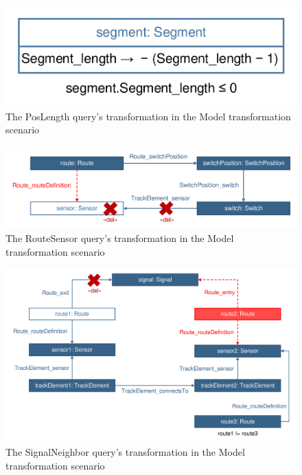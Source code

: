 \begin{figure}[!Htb]
	\centering
	\includegraphics[scale=0.4]{figures/trainbenchmark-transformation-xform-poslength}
	\caption{The PosLength query's transformation in the Model transformation scenario}
	\label{fig:trainbenchmark-transformation-xform-poslength}
\end{figure}

\begin{figure}[!Htb]
	\centering
	\includegraphics[scale=0.4]{figures/trainbenchmark-transformation-xform-routesensor}
	\caption{The RouteSensor query's transformation in the Model transformation scenario}
	\label{fig:trainbenchmark-transformation-xform-routesensor}
\end{figure}

\begin{figure}[!Htb]
	\centering
	\includegraphics[scale=0.4]{figures/trainbenchmark-transformation-xform-signalneighbor}
	\caption{The SignalNeighbor query's transformation in the Model transformation scenario}
	\label{fig:trainbenchmark-transformation-xform-signalneighbor}
\end{figure}

